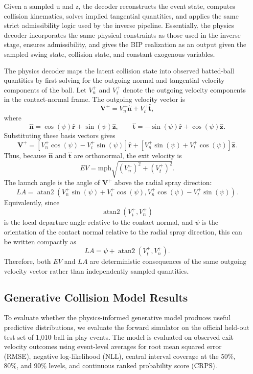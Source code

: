 \documentclass[11pt]{article}
\begin{document}
Given a sampled u and z, the decoder reconstructs the event state, computes collision kinematics, solves implied tangential quantities, and applies the same strict admissibility logic used by the inverse pipeline. Essentially, the physics decoder incorporates the same physical constraints as those used in the inverse stage, ensures admissibility, and gives the BIP realization as an output given the sampled swing state, collision state, and constant exogenous variables.

The physics decoder maps the latent collision state into observed batted-ball
quantities by first solving for the outgoing normal and tangential velocity
components of the ball. Let \(V_n^+\) and \(V_t^+\) denote the outgoing velocity
components in the contact-normal frame. The outgoing velocity vector is
\[
\mathbf V^+
=
V_n^+\hat{\mathbf n}
+
V_t^+\hat{\mathbf t},
\]
where
\[
\hat{\mathbf n}
=
\cos(\psi)\hat{\mathbf r}
+
\sin(\psi)\hat{\mathbf z},
\qquad
\hat{\mathbf t}
=
-\sin(\psi)\hat{\mathbf r}
+
\cos(\psi)\hat{\mathbf z}.
\]
Substituting these basis vectors gives
\[
\mathbf V^+
=
\left[
V_n^+\cos(\psi)-V_t^+\sin(\psi)
\right]\hat{\mathbf r}
+
\left[
V_n^+\sin(\psi)+V_t^+\cos(\psi)
\right]\hat{\mathbf z}.
\]
Thus, because \(\hat{\mathbf n}\) and \(\hat{\mathbf t}\) are orthonormal, the
exit velocity is
\[
EV
=
{\mathrm{mph}}
\sqrt{(V_n^+)^2+(V_t^+)^2}.
\]
The launch angle is the angle of \(\mathbf V^+\) above the radial spray
direction:
\[
LA
=
\operatorname{atan2}
\left(
V_n^+\sin(\psi)+V_t^+\cos(\psi),
V_n^+\cos(\psi)-V_t^+\sin(\psi)
\right).
\]
Equivalently, since
\[
\operatorname{atan2}(V_t^+,V_n^+)
\]
is the local departure angle relative to the contact normal, and \(\psi\) is the
orientation of the contact normal relative to the radial spray direction, this
can be written compactly as
\[
LA
=
\psi
+
\operatorname{atan2}(V_t^+,V_n^+).
\]
Therefore, both \(EV\) and \(LA\) are deterministic consequences of the same
outgoing velocity vector rather than independently sampled quantities.

\subsection{Generative Collision Model Results}

To evaluate whether the physics-informed generative model produces useful predictive distributions, we evaluate the forward simulator on the official held-out test set of 1,010 ball-in-play events. The model is evaluated on observed exit velocity outcomes using event-level averages for root mean squared error (RMSE), negative log-likelihood (NLL), central interval coverage at the 50\%, 80\%, and 90\% levels, and continuous ranked probability score (CRPS).
\end{document}
